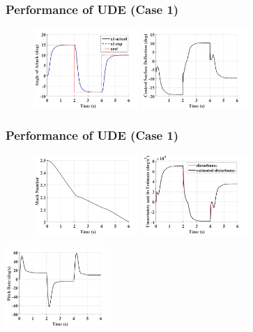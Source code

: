 \documentclass[table,10pt,red]{beamer}	%
\begin{document}
\begin{frame}
\frametitle{Performance of UDE (Case 1)}
\begin{figure}
\includegraphics[width=4cm]{1_ude_varying-mach_x1}
\includegraphics[width=4cm]{2_ude_varying-mach_control}
\end{figure}



\end{frame}	

\begin{frame}
\frametitle{Performance of UDE (Case 1)}
\begin{figure}
	\includegraphics[width=4cm]{3_ude_varying-mach_mach}
	\includegraphics[width=4cm]{4_ude_varying-mach_dist}
\end{figure}
	\begin{center}
	\includegraphics[width=4cm]{5_ude_varying-mach_pitch}
	\end{center}

\end{frame}
\end{document}
